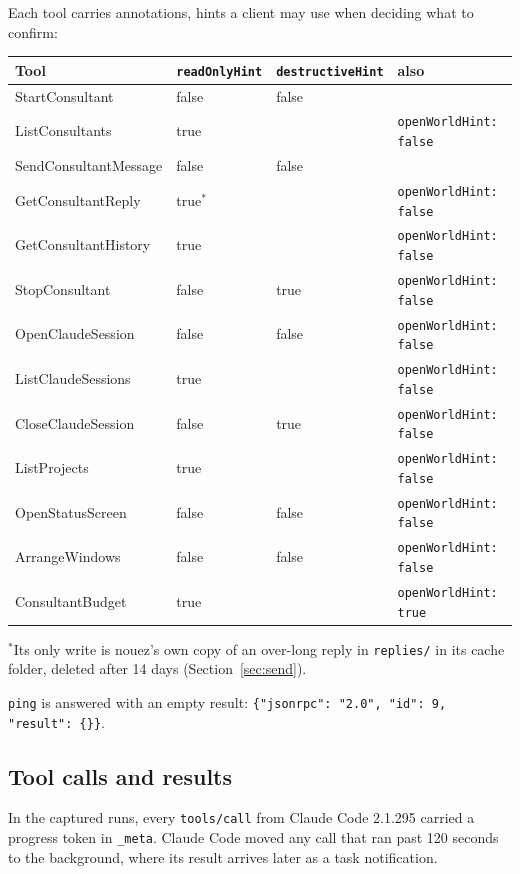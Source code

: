 \documentclass[10pt,a4paper]{article}
\newcommand{\code}[1]{\texttt{#1}}
\begin{document}
Each tool carries annotations, hints a client may use when deciding what to confirm:

\begin{center}\small
\begin{tabular}{@{}l l l l@{}}
\toprule
\textbf{Tool} & \code{readOnlyHint} & \code{destructiveHint} & \textbf{also} \\
\midrule
StartConsultant & false & false & \\
ListConsultants & true & & \code{openWorldHint: false} \\
SendConsultantMessage & false & false & \\
GetConsultantReply & true$^*$ & & \code{openWorldHint: false} \\
GetConsultantHistory & true & & \code{openWorldHint: false} \\
StopConsultant & false & true & \code{openWorldHint: false} \\
OpenClaudeSession & false & false & \code{openWorldHint: false} \\
ListClaudeSessions & true & & \code{openWorldHint: false} \\
CloseClaudeSession & false & true & \code{openWorldHint: false} \\
ListProjects & true & & \code{openWorldHint: false} \\
OpenStatusScreen & false & false & \code{openWorldHint: false} \\
ArrangeWindows & false & false & \code{openWorldHint: false} \\
ConsultantBudget & true & & \code{openWorldHint: true} \\
\bottomrule
\end{tabular}
\end{center}

{\small $^*$Its only write is nouez's own copy of an over-long reply in \code{replies/} in its
cache folder, deleted after 14 days (Section~\ref{sec:send}).}

\code{ping} is answered with an empty result: \code{\{"jsonrpc": "2.0", "id": 9, "result": \{\}\}}.

\subsection{Tool calls and results}

In the captured runs, every \code{tools/call} from Claude Code 2.1.295 carried a progress token in
\code{\_meta}. Claude Code moved any call that ran past 120 seconds to the background, where its
result arrives later as a task notification.
\end{document}
